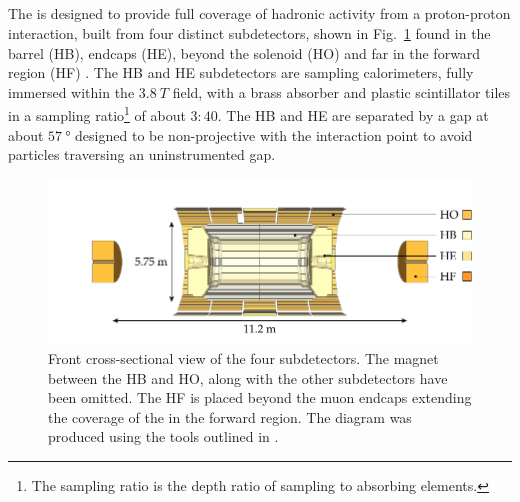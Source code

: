 \subsection{\HCAL}

The \HCAL \cite{Bayatian:922757} is designed to provide full coverage of hadronic activity from a proton-proton interaction, built from four distinct subdetectors, shown in Fig.~\ref{fig:cms-hcal} found in the barrel (HB), endcaps (HE), beyond the solenoid (HO) and far in the forward region (HF) \cite{Mans:1481837}. The HB and HE subdetectors are sampling calorimeters, fully immersed within the ${\SI{3.8}{T}}$ field, with a brass absorber and plastic scintillator tiles in a sampling ratio\footnote{The sampling ratio is the depth ratio of sampling to absorbing elements.} of about $3:40$. The HB and HE are separated by a gap at about $\SI{57}{\degree}$ designed to be non-projective with the interaction point to avoid particles traversing an uninstrumented gap.

\begin{figure}[htb]
    \centering
    \includegraphics{diagrams/tikz/cms/annotated/cms_hcal.pdf}
    \caption[Front cross-section view of the four HCAL subdetectors]{
        Front cross-sectional view of the four \HCAL subdetectors. The magnet between the HB and HO, along with the other subdetectors have been omitted. The HF is placed beyond the muon endcaps extending the coverage of the \HCAL in the forward region. The diagram was produced using the tools outlined in \cite{Sakuma:2013jqa}.
    }
    \label{fig:cms-hcal}
\end{figure}

